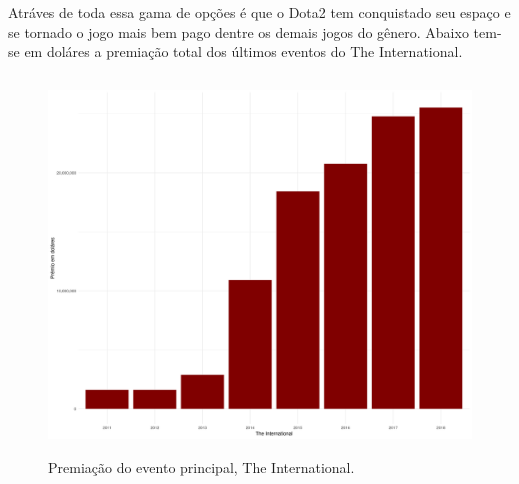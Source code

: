 \documentclass[
12pt,				%
openright,			%
oneside,			%
a4paper,			%
english,			%
brazil,				%
]{abntex2}
\begin{document}
Atráves de toda essa gama de opções é que o Dota2 tem conquistado seu espaço e se tornado o jogo
mais bem pago dentre os demais jogos do gênero. Abaixo tem-se em doláres a premiação total dos
últimos eventos do The International.

\begin{figure}[H]
  \begin{center}
    \includegraphics[width=14cm,height=10cm]{image/dotaprize.png}
    \caption{Premiação do evento principal, The International.}
  \end{center}
\end{figure}





%


\end{document}
